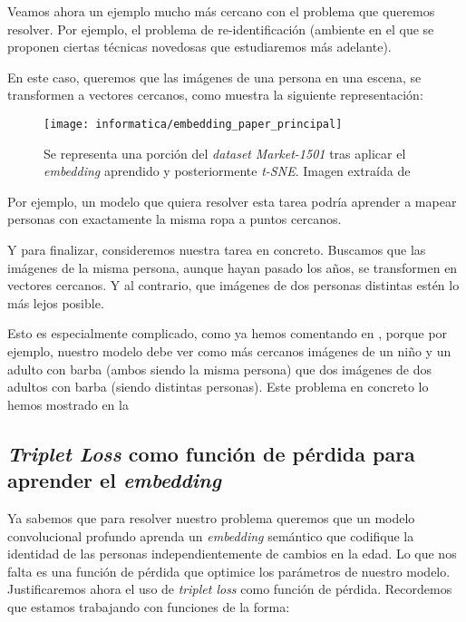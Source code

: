 \begin{ejemplo}
    Veamos ahora un ejemplo mucho más cercano con el problema que queremos resolver. Por ejemplo, el problema de re-identificación (ambiente en el que se proponen ciertas técnicas novedosas que estudiaremos más adelante).

    En este caso, queremos que las imágenes de una persona en una escena, se transformen a vectores cercanos, como muestra la siguiente representación:

    \begin{figure}[H]
        \centering
        \texttt{[image: informatica/embedding\_paper\_principal]}
        \caption{Se representa una porción del \textit{dataset} \textit{Market-1501} tras aplicar el \textit{embedding} aprendido y posteriormente \textit{t-SNE}. Imagen extraída de \cite{informatica:principal}}
    \end{figure}

    Por ejemplo, un modelo que quiera resolver esta tarea podría aprender a mapear personas con exactamente la misma ropa a puntos cercanos.
\end{ejemplo}

\begin{ejemplo}

    Y para finalizar, consideremos nuestra tarea en concreto. Buscamos que las imágenes de la misma persona, aunque hayan pasado los años, se transformen en vectores cercanos. Y al contrario, que imágenes de dos personas distintas estén lo más lejos posible.

    Esto es especialmente complicado, como ya hemos comentando en , porque por ejemplo, nuestro modelo debe ver como más cercanos imágenes de un niño y un adulto con barba (ambos siendo la misma persona) que dos imágenes de dos adultos con barba (siendo distintas personas). Este problema en concreto lo hemos mostrado en la 
\end{ejemplo}


\subsection{\textit{Triplet Loss} como función de pérdida para aprender el \textit{embedding}} \label{isec:triplet_loss}

Ya sabemos que para resolver nuestro problema queremos que un modelo convolucional profundo aprenda un \textit{embedding} semántico que codifique la identidad de las personas independientemente de cambios en la edad. Lo que nos falta es una función de pérdida que optimice los parámetros de nuestro modelo. Justificaremos ahora el uso de \textit{triplet loss} como función de pérdida. Recordemos que estamos trabajando con funciones de la forma:

